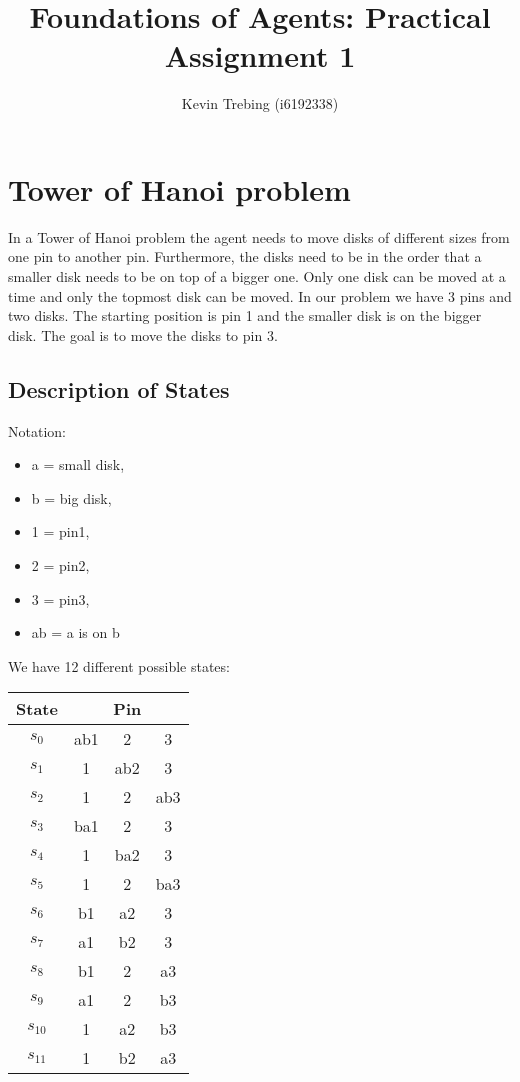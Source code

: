 \documentclass[a4paper]{article}
\title{Foundations of Agents: Practical Assignment 1}
\author{Kevin Trebing (i6192338)}
\begin{document}
\maketitle

\section{Tower of Hanoi problem}
In a Tower of Hanoi problem the agent needs to move disks of different sizes from one pin to another pin. Furthermore, the disks need to be in the order that a smaller disk needs to be on top of a bigger one. Only one disk can be moved at a time and only the topmost disk can be moved. In our problem we have 3 pins and two disks. The starting position is pin 1 and the smaller disk is on the bigger disk. The goal is to move the disks to pin 3.

\subsection{Description of States}
Notation:
\begin{multicols}{2}
\begin{itemize}

\item a = small disk,
\item b = big disk,
\item 1 = pin1,
\item 2 = pin2,
\item 3 = pin3,
\item ab = a is on b
\end{itemize}
\end{multicols}

\noindent
We have 12 different possible states: \\

\begin{tabular}{ c|c|c|c}
	State & \multicolumn{3}{c}{Pin} \\
	\hline
	$s_{0}$ & ab1 & 2 & 3 \\
	$s_{1}$ & 1 & ab2 & 3 \\
	$s_{2}$ & 1 & 2 & ab3 \\
	$s_{3}$ & ba1 & 2 & 3 \\
	$s_{4}$ & 1 & ba2 & 3 \\
	$s_{5}$ & 1 & 2 & ba3 \\
	$s_{6}$ & b1 & a2 & 3 \\
	$s_{7}$ & a1 & b2 & 3 \\
	$s_{8}$ & b1 & 2 & a3 \\
	$s_{9}$ & a1 & 2 & b3 \\
	$s_{10}$ & 1 & a2 & b3 \\
	$s_{11}$ & 1 & b2 & a3

\end{tabular}
\end{document}
